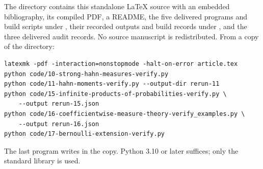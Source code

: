 \documentclass[11pt]{article}
\numberwithin{equation}{section}
\theoremstyle{definition}
\theoremstyle{remark}
\begin{document}
The directory contains this standalone \LaTeX{} source with an embedded
bibliography, its compiled PDF, a README, the five delivered programs and build
scripts under , their recorded outputs and build records under
, and the three delivered audit records. No source manuscript is
redistributed. From a copy of the directory:
\begin{verbatim}
latexmk -pdf -interaction=nonstopmode -halt-on-error article.tex
python code/10-strong-hahn-measures-verify.py
python code/11-hahn-moments-verify.py --output-dir rerun-11
python code/15-infinite-products-of-probabilities-verify.py \
    --output rerun-15.json
python code/16-coefficientwise-measure-theory-verify_examples.py \
    --output rerun-16.json
python code/17-bernoulli-extension-verify.py
\end{verbatim}
The last program writes  in the copy.
Python 3.10 or later suffices; only the standard library is used.
\end{document}
